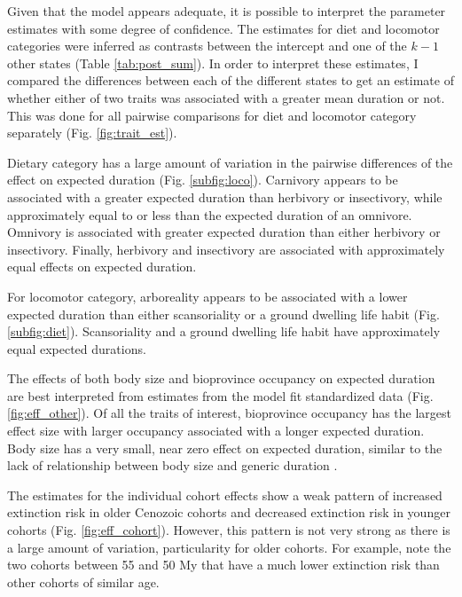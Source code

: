 \documentclass[12pt,letterpaper]{article}
\begin{document}
Given that the model appears adequate, it is possible to interpret the parameter estimates with some degree of confidence. The estimates for diet and locomotor categories were inferred as contrasts between the intercept and one of the \(k - 1\) other states (Table \ref{tab:post_sum}). In order to interpret these estimates, I compared the differences between each of the different states to get an estimate of whether either of two traits was associated with a greater mean duration or not. This was done for all pairwise comparisons for diet and locomotor category separately (Fig. \ref{fig:trait_est}).

Dietary category has a large amount of variation in the pairwise differences of the effect on expected duration (Fig. \ref{subfig:loco}). Carnivory appears to be associated with a greater expected duration than herbivory or insectivory, while approximately equal to or less than the expected duration of an omnivore. Omnivory is associated with greater expected duration than either herbivory or insectivory. Finally, herbivory and insectivory are associated with approximately equal effects on expected duration.

For locomotor category, arboreality appears to be associated with a lower expected duration than either scansoriality or a ground dwelling life habit (Fig. \ref{subfig:diet}). Scansoriality and a ground dwelling life habit have approximately equal expected durations. %

The effects of both body size and bioprovince occupancy on expected duration are best interpreted from estimates from the model fit standardized data (Fig. \ref{fig:eff_other}). Of all the traits of interest, bioprovince occupancy has the largest effect size with larger occupancy associated with a longer expected duration. Body size has a very small, near zero effect on expected duration, similar to the lack of relationship between body size and generic duration \citep{Tomiya2013}.

The estimates for the individual cohort effects show a weak pattern of increased extinction risk in older Cenozoic cohorts and decreased extinction risk in younger cohorts (Fig. \ref{fig:eff_cohort}). However, this pattern is not very strong as there is a large amount of variation, particularity for older cohorts. For example, note the two cohorts between 55 and 50 My that have a much lower extinction risk than other cohorts of similar age.
\end{document}
